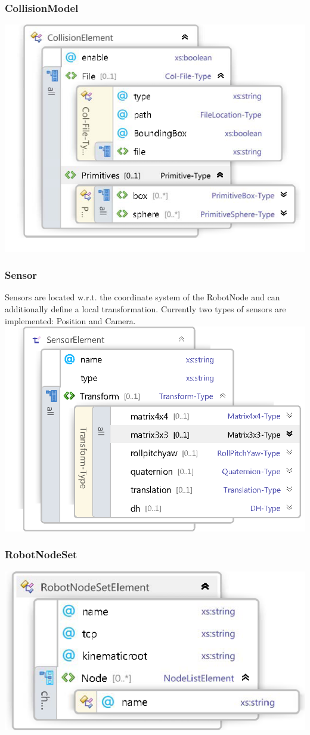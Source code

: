 \subsubsection*{CollisionModel}
\includegraphics[width=\textwidth]{Xsd_CollisionModel} 
\subsubsection*{Sensor}
Sensors are located w.r.t. the coordinate system of the RobotNode and can additionally define a local transformation. Currently two types of sensors are implemented: Position and Camera. 
\includegraphics[width=\textwidth]{Xsd_Sensor} 
\subsubsection*{RobotNodeSet}
\includegraphics[width=\textwidth]{Xsd_RobotNodeSet} 
